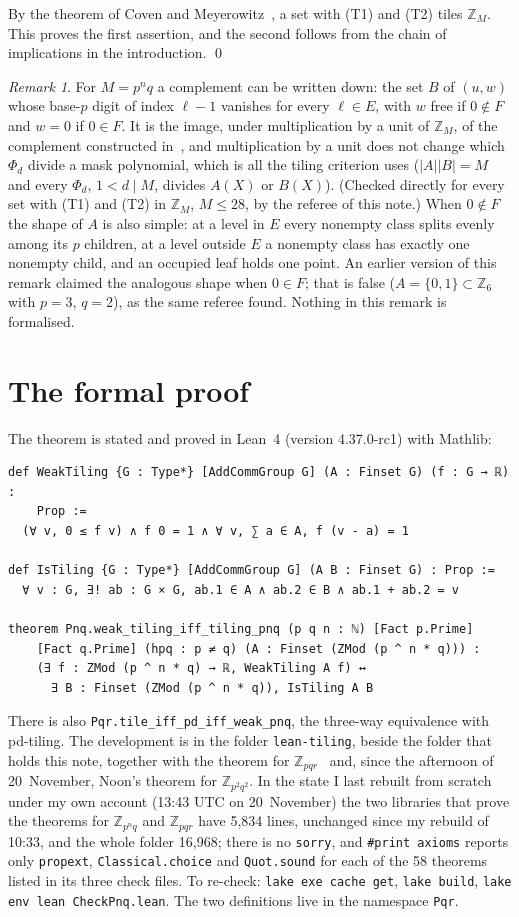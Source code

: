 \documentclass[11pt,a4paper]{amsart}
\theoremstyle{definition}
\theoremstyle{remark}
\newtheorem{remark}[theorem]{Remark}
\newcommand{\Z}{\mathbb{Z}}
\newcommand{\lean}[1]{\texttt{#1}}
\begin{document}
By the theorem of Coven and Meyerowitz~\cite{CM}, a set with (T1) and (T2) tiles $\Z_M$. This proves the
first assertion, and the second follows from the chain of implications in the introduction. \qed

\begin{remark}
For $M=p^nq$ a complement can be written down: the set $B$ of $(u,w)$ whose base-$p$ digit of index $\ell-1$
vanishes for every $\ell\in E$, with $w$ free if $0\notin F$ and $w=0$ if $0\in F$. It is the image, under
multiplication by a unit of $\Z_M$, of the complement constructed in~\cite{CM}, and multiplication by a unit
does not change which $\Phi_d$ divide a mask polynomial, which is all the tiling criterion uses
($|A||B|=M$ and every $\Phi_d$, $1<d\mid M$, divides $A(X)$ or $B(X)$). (Checked directly for every set with (T1) and (T2)
in $\Z_M$, $M\le 28$, by the referee of this note.) When $0\notin F$ the shape of $A$ is also simple: at a
level in $E$ every nonempty class splits evenly among its $p$ children, at a level outside $E$ a nonempty
class has exactly one nonempty child, and an occupied leaf holds one point. An earlier version of this
remark claimed the analogous shape when $0\in F$; that is false ($A=\{0,1\}\subset\Z_6$ with $p=3$,
$q=2$), as the same referee found. Nothing in this remark is formalised.
\end{remark}

\section{The formal proof}\label{sec:lean}

The theorem is stated and proved in Lean~4 (version 4.37.0-rc1) with Mathlib:
\begin{verbatim}
def WeakTiling {G : Type*} [AddCommGroup G] (A : Finset G) (f : G → ℝ) :
    Prop :=
  (∀ v, 0 ≤ f v) ∧ f 0 = 1 ∧ ∀ v, ∑ a ∈ A, f (v - a) = 1

def IsTiling {G : Type*} [AddCommGroup G] (A B : Finset G) : Prop :=
  ∀ v : G, ∃! ab : G × G, ab.1 ∈ A ∧ ab.2 ∈ B ∧ ab.1 + ab.2 = v

theorem Pnq.weak_tiling_iff_tiling_pnq (p q n : ℕ) [Fact p.Prime]
    [Fact q.Prime] (hpq : p ≠ q) (A : Finset (ZMod (p ^ n * q))) :
    (∃ f : ZMod (p ^ n * q) → ℝ, WeakTiling A f) ↔
      ∃ B : Finset (ZMod (p ^ n * q)), IsTiling A B
\end{verbatim}
There is also \lean{Pqr.tile\_iff\_pd\_iff\_weak\_pnq}, the three-way equivalence with pd-tiling. The
development is in the folder \lean{lean-tiling}, beside the folder that holds this note, together with the theorem for
$\Z_{pqr}$~\cite{N} and, since the afternoon of 20~November, Noon's theorem for $\Z_{p^2q^2}$. In the state I last
rebuilt from scratch under my own account (13:43 UTC on 20~November) the two libraries that prove the theorems for
$\Z_{p^nq}$ and $\Z_{pqr}$ have 5{,}834 lines, unchanged since my rebuild of 10:33, and the whole folder
16{,}968; there is no \lean{sorry}, and
\lean{\#print axioms} reports only \lean{propext}, \lean{Classical.choice} and \lean{Quot.sound} for each of the
58 theorems listed in its three check files. To re-check: \lean{lake exe cache get}, \lean{lake build},
\lean{lake env lean CheckPnq.lean}. The two definitions live in the namespace \lean{Pqr}.
\end{document}
